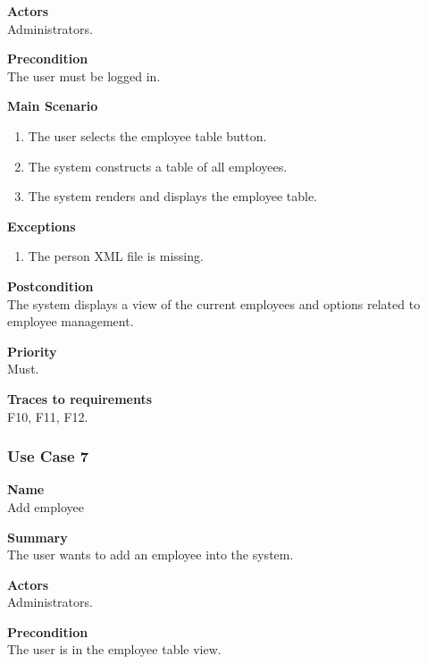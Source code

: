 \documentclass[12pt]{article}
\begin{document}
\noindent
{\bf Actors}\\
Administrators.

\noindent
{\bf Precondition}\\
The user must be logged in.

\noindent
{\bf Main Scenario}\\
\vspace*{-0.35in}
\begin{enumerate}
\item The user selects the employee table button.
\vspace*{-0.1in}
\item The system constructs a table of all employees.
\vspace*{-0.1in}
\item The system renders and displays the employee table.
\end{enumerate}
\vspace*{-0.1in}

\noindent
{\bf Exceptions}\\
\vspace*{-0.35in}
\begin{enumerate}
\item The person XML file is missing.
\end{enumerate}
\vspace*{-0.1in}

\noindent
{\bf Postcondition}\\
The system displays a view of the current employees and options related to employee management.

\noindent
{\bf Priority}\\
Must.

\noindent
{\bf Traces to requirements}\\
F10, F11, F12.

\subsubsection{Use Case 7} \label{uc:7}

\noindent
{\bf Name}\\
Add employee

\noindent
{\bf Summary}\\
The user wants to add an employee into the system.

\noindent
{\bf Actors}\\
Administrators.

\noindent
{\bf Precondition}\\
The user is in the employee table view.
\end{document}
